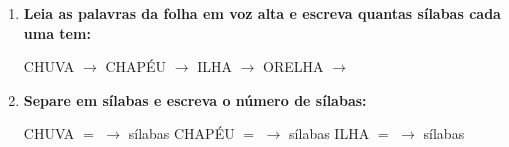 \begin{exercicio}
\begin{enumerate}[resume]
  \item \textbf{Leia as palavras da folha em voz alta e escreva quantas sílabas cada uma tem:}

  \begin{center}
  CHUVA $\rightarrow$ \underline{\hspace{1cm}} \quad CHAPÉU $\rightarrow$ \underline{\hspace{1cm}} \quad ILHA $\rightarrow$ \underline{\hspace{1cm}} \quad ORELHA $\rightarrow$ \underline{\hspace{1cm}}
  \end{center}

  \item \textbf{Separe em sílabas e escreva o número de sílabas:}
  \begin{center}
  CHUVA $=$ \underline{\hspace{1.2cm}} $\rightarrow$ \underline{\hspace{0.8cm}} sílabas \quad CHAPÉU $=$ \underline{\hspace{1.2cm}} $\rightarrow$ \underline{\hspace{0.8cm}} sílabas \quad ILHA $=$ \underline{\hspace{1.2cm}} $\rightarrow$ \underline{\hspace{0.8cm}} sílabas
  \end{center}

\end{enumerate}

\end{exercicio}



